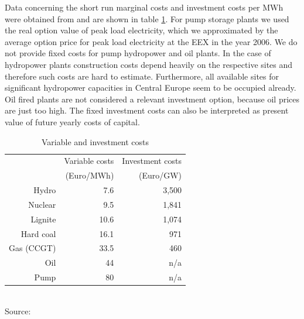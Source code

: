 Data concerning the short run marginal costs and investment costs per MWh were obtained from \cite{Auer2006} and are shown in table \ref{tab:costs}. For pump storage plants we used the real option value of peak load electricity, which we approximated by the average option price for peak load electricity at the EEX in the year 2006. We do not provide fixed costs for pump hydropower and oil plants. In the case of hydropower plants construction costs depend heavily on the respective sites and therefore such costs are hard to estimate. Furthermore, all available sites for significant hydropower capacities in Central Europe seem to be occupied already. Oil fired plants are not considered a relevant investment option, because oil prices are just too high. The fixed investment costs can also be interpreted as present value of future yearly costs of capital.

\begin{table}[htb]
\centering
\caption{Variable and investment costs}
\vspace{0.3cm}
\begin{tabular}{rrr}
\hline
           & Variable costs & Investment costs\\
           &  (Euro/MWh)    &  (Euro/GW) \\
\hline\hline
     Hydro &        7.6 &    3,500\\

   Nuclear &        9.5 &    1,841 \\

   Lignite &       10.6 &    1,074 \\

 Hard coal &       16.1 &     971 \\

 Gas (CCGT) &       33.5 &     460 \\

Oil & 44            &   n/a\\

Pump &         80 &       n/a\\
\hline
\end{tabular}
\label{tab:costs}
\\
\vspace{0.3cm}
\scriptsize Source: \cite{Auer2006}
\end{table}



